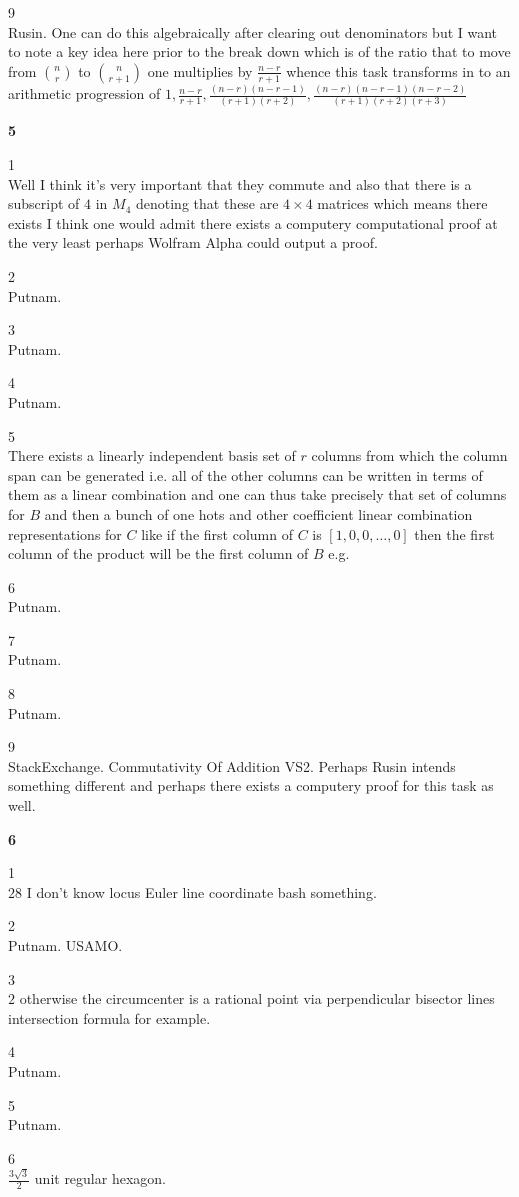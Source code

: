 9 \\
Rusin. One can do this algebraically after clearing out denominators but I want to note a key idea here prior to the break down which is of the ratio that to move from $\binom{n}{r}$ to $\binom{n}{r+1}$ one multiplies by $\frac{n-r}{r+1}$ whence this task transforms in to an arithmetic progression of $1,\frac{n-r}{r+1},\frac{(n-r)(n-r-1)}{(r+1)(r+2)},\frac{(n-r)(n-r-1)(n-r-2)}{(r+1)(r+2)(r+3)}$

\newpage

\textbf{5}

1 \\
Well I think it's very important that they commute and also that there is a subscript of $4$ in $M_4$ denoting that these are $4 \times 4$ matrices which means there exists I think one would admit there exists a computery computational proof at the very least perhaps Wolfram Alpha could output a proof.

2 \\
Putnam.

3 \\
Putnam.

4 \\
Putnam.

5 \\
There exists a linearly independent basis set of $r$ columns from which the column span can be generated i.e. all of the other columns can be written in terms of them as a linear combination and one can thus take precisely that set of columns for $B$ and then a bunch of one hots and other coefficient linear combination representations for $C$ like if the first column of $C$ is $[1,0,0,\dots,0]$ then the first column of the product will be the first column of $B$ e.g.

6 \\
Putnam.

7 \\
Putnam.

8 \\
Putnam.

9 \\
StackExchange. Commutativity Of Addition VS2. Perhaps Rusin intends something different and perhaps there exists a computery proof for this task as well.

\newpage

\textbf{6}

1 \\
$\boxed{28}$ I don't know locus Euler line coordinate bash something.

2 \\
Putnam. USAMO.

3 \\
$\boxed{2}$ otherwise the circumcenter is a rational point via perpendicular bisector lines intersection formula for example.

4 \\
Putnam.

5 \\
Putnam.

6 \\
$\boxed{\frac{3\sqrt{3}}{2}}$ unit regular hexagon.